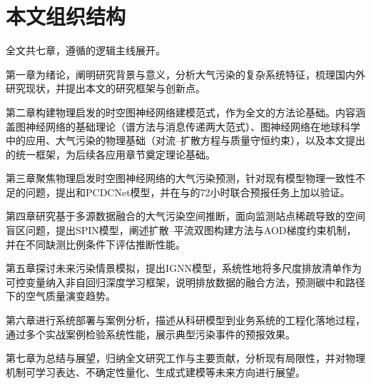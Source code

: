 \section{本文组织结构}
\label{sec:organization}

全文共七章，遵循的逻辑主线展开。

第一章为绪论，阐明研究背景与意义，分析大气污染的复杂系统特征，梳理国内外研究现状，并提出本文的研究框架与创新点。

第二章构建物理启发的时空图神经网络建模范式，作为全文的方法论基础。内容涵盖图神经网络的基础理论（谱方法与消息传递两大范式）、图神经网络在地球科学中的应用、大气污染的物理基础（对流--扩散方程与质量守恒约束），以及本文提出的统一框架，为后续各应用章节奠定理论基础。

第三章聚焦物理启发时空图神经网络的大气污染预测，针对现有模型物理一致性不足的问题，提出\ModelPred{}和PCDCNet模型，并在\PM 与\ozone 的72小时联合预报任务上加以验证。

第四章研究基于多源数据融合的大气污染空间推断，面向监测站点稀疏导致的空间盲区问题，提出SPIN模型，阐述扩散--平流双图构建方法与AOD梯度约束机制，并在不同缺测比例条件下评估推断性能。

第五章探讨未来污染情景模拟，提出IGNN模型，系统性地将多尺度排放清单作为可控变量纳入非自回归深度学习框架，说明排放数据的融合方法，预测碳中和路径下的空气质量演变趋势。

第六章进行系统部署与案例分析，描述从科研模型到业务系统的工程化落地过程，通过多个实战案例检验系统性能，展示典型污染事件的预报效果。

第七章为总结与展望，归纳全文研究工作与主要贡献，分析现有局限性，并对物理机制可学习表达、不确定性量化、生成式建模等未来方向进行展望。